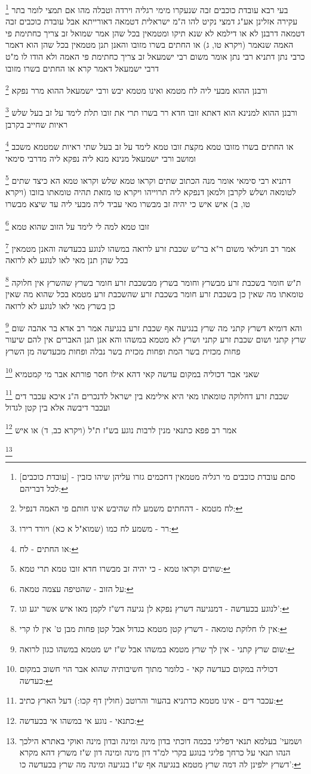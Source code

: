\documentclass[12pt, openany]{book}
\newcommand{\footnotecomment}[1]{
	\renewcommand\thefootnote{}
	\footnote{#1}}
\newcommand{\commenta}[1]{\footnotecomment{#1}}
\begin{document}
{\commenta{[עובדת כוכבים] - סתם עובדת כוכבים מי רגליה מטמאין דחכמים גזרו עליהן שיהו כזבין לכל דבריהם:}
בעי רבא עובדת כוכבים זבה שנעקרו מימי רגליה
וירדה וטבלה מהו 
אם תמצי לומר בתר עקירה אזלינן אע"ג דמצי נקיט להו ה"מ ישראלית דטמאה דאורייתא אבל עובדת כוכבים זבה דטמאה דרבנן לא או דילמא לא שנא תיקו
ומטמאין בכל שהן אמר שמואל זב צריך כחתימת פי האמה שנאמר (ויקרא טו, ג) או החתים בשרו מזובו 
והאנן תנן מטמאין בכל שהן הוא דאמר כרבי נתן דתניא רבי נתן אומר משום רבי ישמעאל זב צריך כחתימת פי האמה ולא הודו לו 
מ"ט דרבי ישמעאל דאמר קרא או החתים בשרו מזובו 
\commenta{לח מטמא - דהחתים משמע לח שהיבש אינו חותם פי האמה דנפיל:}
ורבנן ההוא מבעי ליה לח מטמא ואינו מטמא יבש 
ורבי ישמעאל ההוא מרר נפקא 
\commenta{רר - משמע לח כמו (שמוא"ל א כא) ויורד רירו:}
ורבנן ההוא למנינא הוא דאתא זובו חדא רר בשרו תרי את זובו תלת לימד על זב בעל שלש ראיות שחייב בקרבן 
\commenta{או החתים - לח:}
או החתים בשרו מזובו טמא מקצת זובו טמא לימד על זב בעל שתי ראיות שמטמא משכב ומושב ורבי ישמעאל מנינא מנא ליה נפקא ליה מדרבי סימאי
\commenta{שתים וקראו טמא - כי יהיה זב מבשרו חדא זובו טמא תרי טמא:}
דתניא רבי סימאי אומר מנה הכתוב שתים וקראו טמא שלש וקראו טמא הא כיצד שתים לטומאה ושלש לקרבן 
ולמאן דנפקא ליה תרוייהו {ויקרא טו } מזאת תהיה טומאתו בזובו (ויקרא טו, ב) איש איש כי יהיה זב מבשרו מאי עביד ליה מבעי ליה עד שיצא מבשרו 
\commenta{על הזוב - שהטיפה עצמה טמאה:}
זובו טמא למה לי לימד על הזוב שהוא טמא 
\commenta{לנוגע בכעדשה - דמנגיעה דשרץ נפקא לן נגיעה דש"ז לקמן מאו איש אשר יגע וגו':}
אמר רב חנילאי משום ר"א בר"ש שכבת זרע לרואה במשהו לנוגע בכעדשה והאנן מטמאין בכל שהן תנן מאי לאו לנוגע לא לרואה 
\commenta{אין לו חלוקת טומאה - דשרץ קטן מטמא כגדול אבל קטן פחות מבן ט' אין לו קרי:}
ת"ש חומר בשכבת זרע מבשרץ וחומר בשרץ מבשכבת זרע חומר בשרץ שהשרץ אין חלוקה טומאתו מה שאין כן בשכבת זרע חומר בשכבת זרע שהשכבת זרע מטמא בכל שהוא מה שאין כן בשרץ 
מאי לאו לנוגע  לא לרואה 
\commenta{שום שרץ קתני - אין לך שרץ מטמא במשהו אבל ש"ז יש מטמא במשהו כגון לרואה:}
והא דומיא דשרץ קתני מה שרץ בנגיעה אף שכבת זרע בנגיעה אמר רב אדא בר אהבה שום שרץ קתני ושום שכבת זרע קתני 
ושרץ לא מטמא במשהו והא אנן תנן האברים אין להם שיעור פחות מכזית בשר המת ופחות מכזית בשר נבלה ופחות מכעדשה מן השרץ 
\commenta{דכוליה במקום כעדשה קאי - כלומר מתוך חשיבותיה שהוא אבר הוי חשוב במקום כעדשה:}
שאני אבר דכוליה במקום עדשה קאי דהא אילו חסר פורתא אבר מי קמטמיא 
\commenta{עכבר דים - אינו מטמא כדתניא בהעור והרוטב (חולין דף קכו:) דעל הארץ כתיב:}
שכבת זרע דחלוקה טומאתו מאי היא אילימא בין ישראל לדנכרים ה"נ איכא עכבר דים ועכבר דיבשה 
אלא בין קטן לגדול 
\commenta{כתנאי - נוגע אי במשהו אי בכעדשה:}
אמר רב פפא כתנאי מנין לרבות נוגע בש"ז ת"ל (ויקרא כב, ד) או איש 
\commenta{ושמעי' בעלמא תנאי דפליגי בכמה דוכתי בדון מינה ומינה ובדון מינה ואוקי באתרא הילכך הנהו תנאי על כרחך פליגי בנוגע בקרי למ"ד דון מינה ומינה דון ש"ז משרץ דהא מקרא דשרץ ילפינן לה דמה שרץ מטמא בנגיעה אף ש"ז בנגיעה ומינה מה שרץ בכעדשה כו':}
}
\end{document}
